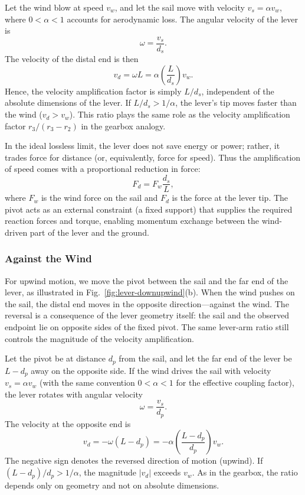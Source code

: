 \documentclass[reprint,aps,pra,longbibliography]{revtex4-2}
\begin{document}
Let the wind blow at speed $v_w$, and let the sail move with velocity $v_s = \alpha v_w$, where $0 < \alpha < 1$ accounts for aerodynamic loss. The angular velocity of the lever is
\begin{equation}
\omega = \frac{v_s}{d_s}.
\end{equation}
The velocity of the distal end is then
\begin{equation}
v_d = \omega L = \alpha \left(\frac{L}{d_s}\right) v_w.
\end{equation}
Hence, the velocity amplification factor is simply $L/d_s$, independent of the absolute dimensions of the lever. If $L/d_s > 1/\alpha$, the lever's tip moves faster than the wind ($v_d > v_w$).
This ratio plays the same role as the velocity amplification factor
$r_3/(r_3 - r_2)$ in the gearbox analogy.

In the ideal lossless limit, the lever does not save energy or power; rather,
it trades force for distance (or, equivalently, force for speed). Thus the
amplification of speed comes with a proportional reduction in force:
\begin{equation}
F_d = F_w \frac{d_s}{L},
\end{equation}
where $F_w$ is the wind force on the sail and $F_d$ is the force at the lever tip. The pivot acts as an external constraint (a fixed support) that supplies the required reaction forces and torque, enabling momentum exchange between the wind-driven part of the lever and the ground.

\subsubsection{Against the Wind}

For upwind motion, we move the pivot between the sail and the far end of the
lever, as illustrated in Fig.~\ref{fig:lever-downupwind}(b). When the wind
pushes on the sail, the distal end moves in the opposite direction---against
the wind. The reversal is a consequence of the lever geometry itself: the sail
and the observed endpoint lie on opposite sides of the fixed pivot. The same
lever-arm ratio still controls the magnitude of the velocity amplification.

Let the pivot be at distance $d_p$ from the sail, and let the far end of the lever be $L - d_p$ away on the opposite side. If the wind drives the sail with velocity $v_s = \alpha v_w$ (with the same convention $0 < \alpha < 1$ for the effective coupling factor), the lever rotates with angular velocity
\begin{equation}
\omega = \frac{v_s}{d_p}.
\end{equation}
The velocity at the opposite end is
\begin{equation}
v_d = -\omega (L - d_p) = -\alpha \left(\frac{L - d_p}{d_p}\right) v_w.
\end{equation}
The negative sign denotes the reversed direction of motion (upwind). If $(L - d_p)/d_p > 1/\alpha$, the magnitude $|v_d|$ exceeds $v_w$. As in the gearbox, the ratio depends only on geometry and not on absolute dimensions.
\end{document}
